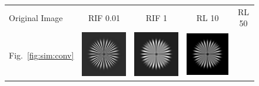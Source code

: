 \documentclass{./packages/optica-article}
\begin{document}
\begin{figure}
	\centering
	\begin{tabular}[t]{l c c c c}
		Original Image                                                                  & RIF 0.01 & RIF 1 & RL 10 & RL 50 \\
		Fig.~\ref{fig:sim:conv}                                                         &
		\includegraphics[scale=0.25]{Simulation deconvolution/ref_conv/RIF_0.01.png}    &
		\includegraphics[scale=0.25]{Simulation deconvolution/ref_conv/RIF_1.png}       &
		\includegraphics[scale=0.25]{Simulation deconvolution/ref_conv/RL_10.png}       &

\end{tabular}
\end{figure}
\end{document}
